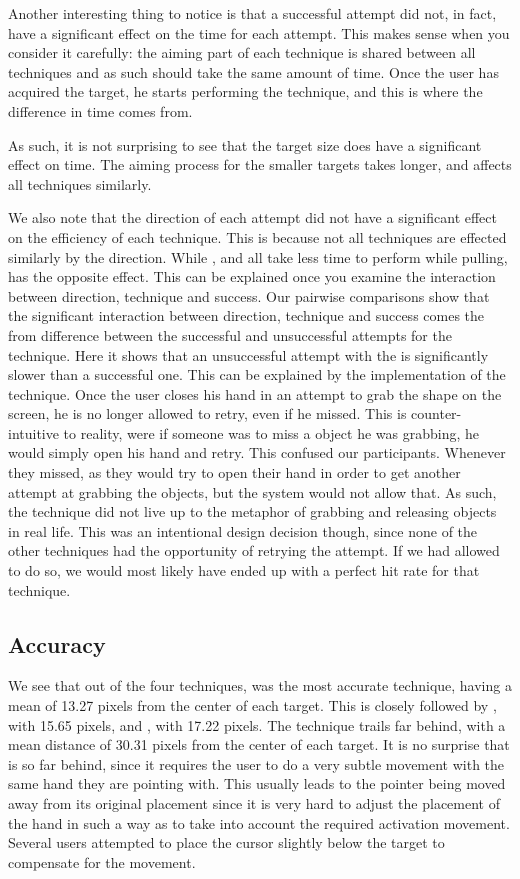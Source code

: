 Another interesting thing to notice is that a successful attempt did not, in fact, have a significant effect on the time for each attempt.
This makes sense when you consider it carefully: the aiming part of each technique is shared between all techniques and as such should take the same amount of time.
Once the user has acquired the target, he starts performing the technique, and this is where the difference in time comes from.

As such, it is not surprising to see that the target size does have a significant effect on time.
The aiming process for the smaller targets takes longer, and affects all techniques similarly.

We also note that the direction of each attempt did not have a significant effect on the efficiency of each technique. 
This is because not all techniques are effected similarly by the direction. 
While \swipe, \throw and \tilt all take less time to perform while pulling, \grab has the opposite effect.
This can be explained once you examine the interaction between direction, technique and success.
Our pairwise comparisons show that the significant interaction between direction, technique and success comes the from difference between the successful and unsuccessful attempts for the \grab \pull technique. 
Here it shows that an unsuccessful attempt with the \grab \pull is significantly slower than a successful one. 
This can be explained by the implementation of the technique. 
Once the user closes his hand in an attempt to grab the shape on the screen, he is no longer allowed to retry, even if he missed.
This is counter-intuitive to reality, were if someone was to miss a object he was grabbing, he would simply open his hand and retry.
This confused our participants. 
Whenever they missed, as they would try to open their hand in order to get another attempt at grabbing the objects, but the system would not allow that.
As such, the \grab \pull technique did not live up to the metaphor of grabbing and releasing objects in real life.
This was an intentional design decision though, since none of the other techniques had the opportunity  of retrying the attempt.
If we had allowed \grab \pull to do so, we would most likely have ended up with a perfect hit rate for that technique. 

\subsection{Accuracy}
\label{sec:accuracy}
We see that out of the four techniques, \swipe was the most accurate technique, having a mean of 13.27 pixels from the center of each target. 
This is closely followed by \throw, with 15.65 pixels, and \grab, with 17.22 pixels.
The \tilt technique trails far behind, with a mean distance of 30.31 pixels from the center of each target.   
It is no surprise that \tilt is so far behind, since it requires the user to do a very subtle movement with the same hand they are pointing with.
This usually leads to the pointer being moved away from its original placement since it is very hard to adjust the placement of the hand in such a way as to take into account the required activation movement. 
Several users attempted to place the cursor slightly below the target to compensate for the movement. 

